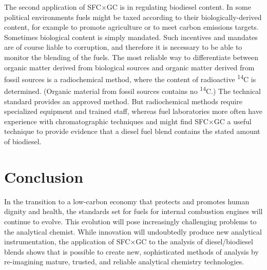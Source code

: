 The second application of SFC×GC is in regulating biodiesel content. In some
political environments fuels might be taxed according to their
biologically-derived content, for example to promote agriculture or to meet
carbon emissions targets. Sometimes biological content is simply mandated. Such
incentives and mandates are of course liable to corruption, and therefore it is
necessary to be able to monitor the blending of the fuels. The most
reliable way to differentiate between organic matter derived from biological
sources and organic matter derived from fossil sources is a radiochemical
method, where the content of radioactive \textsuperscript{14}C is determined.
(Organic material from fossil sources contains no \textsuperscript{14}C.) The
technical standard  provides an approved method. But radiochemical
methods require specialized equipment and trained staff, whereas fuel
laboratories more often have experience with chromatographic techniques and
might find SFC×GC a useful technique to provide evidence that a diesel fuel
blend contains the stated amount of biodiesel.

\section{Conclusion}

In the transition to a low-carbon economy that protects and promotes human
dignity and health, the standards set for fuels for internal combustion engines
will continue to evolve. This evolution will pose increasingly challenging
problems to the analytical chemist. While innovation will undoubtedly produce
new analytical instrumentation, the application of SFC×GC to the analysis of
diesel/biodiesel blends shows that is possible to create new, sophisticated
methods of analysis by re-imagining mature, trusted, and reliable analytical
chemistry technologies.

